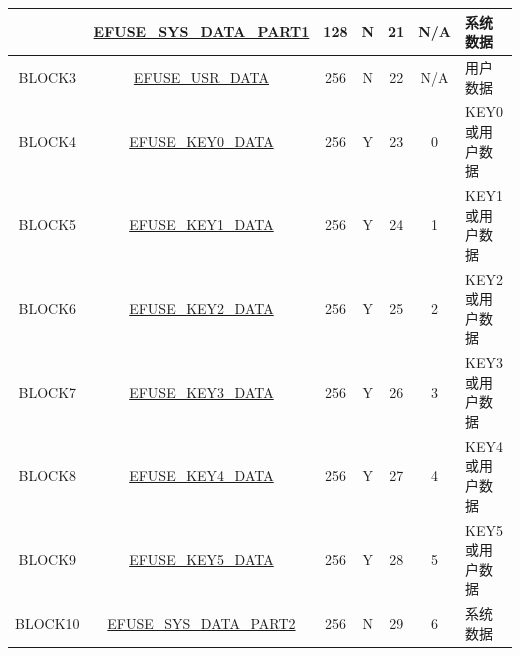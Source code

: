 \begin{longtable}[l]{ |c|c|c|c|c|c|l| }
    & \hyperref[fielddesc:EFUSESYSDATAPART1N]{EFUSE\_SYS\_DATA\_PART1} & 128 & N & 21 & N/A & 系统数据 \\\hline		
    BLOCK3 & \hyperref[fielddesc:EFUSEUSRDATAN]{EFUSE\_USR\_DATA} & 256 & N & 22 & N/A & 用户数据 \\\hline
    BLOCK4 & \hyperref[fielddesc:EFUSEKEY0DATAN]{EFUSE\_KEY0\_DATA} & 256 & Y & 23 & 0 & KEY0 或用户数据 \\
    \hline
    BLOCK5 & \hyperref[fielddesc:EFUSEKEY1DATAN]{EFUSE\_KEY1\_DATA} & 256 & Y & 24 & 1 & KEY1 或用户数据 \\
    \hline
    BLOCK6 & \hyperref[fielddesc:EFUSEKEY2DATAN]{EFUSE\_KEY2\_DATA} & 256 & Y & 25 & 2 & KEY2 或用户数据 \\    
    \hline
    BLOCK7 & \hyperref[fielddesc:EFUSEKEY3DATAN]{EFUSE\_KEY3\_DATA} & 256 & Y & 26 & 3 & KEY3 或用户数据 \\      
    \hline
    BLOCK8 & \hyperref[fielddesc:EFUSEKEY4DATAN]{EFUSE\_KEY4\_DATA} & 256 & Y & 27 & 4 & KEY4 或用户数据 \\      
    \hline
    BLOCK9 & \hyperref[fielddesc:EFUSEKEY5DATAN]{EFUSE\_KEY5\_DATA} & 256 & Y & 28 & 5 & KEY5 或用户数据 \\      
    \hline
    BLOCK10 & \hyperref[fielddesc:EFUSESYSDATAPART2N]{EFUSE\_SYS\_DATA\_PART2} & 256 & N & 29 & 6 & 系统数据 \\ 
    \hline
\end{longtable}